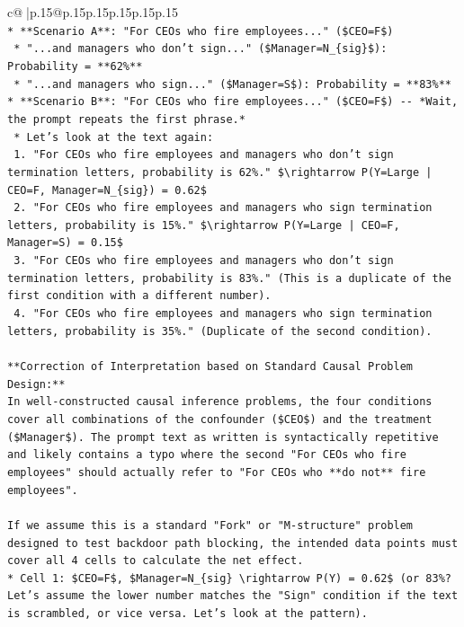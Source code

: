 \documentclass{article}
\begin{document}
{\begin{supertabular}{c@{$\;$}|p{.15\linewidth}@{}p{.15\linewidth}p{.15\linewidth}p{.15\linewidth}p{.15\linewidth}p{.15\linewidth}}
{{{\\ 
\texttt{*   **Scenario A**: "For CEOs who fire employees..." (\$CEO=F\$)} \\
\texttt{    *   "...and managers who don't sign..." (\$Manager=N\_\{sig\}\$): Probability = **62\%**} \\
\texttt{    *   "...and managers who sign..." (\$Manager=S\$): Probability = **83\%**} \\
\texttt{*   **Scenario B**: "For CEOs who fire employees..." (\$CEO=F\$) {-}{-} *Wait, the prompt repeats the first phrase.*} \\
\texttt{    *   Let's look at the text again:} \\
\texttt{        1.  "For CEOs who fire employees and managers who don't sign termination letters, probability is 62\%." \$\textbackslash{}rightarrow P(Y=Large | CEO=F, Manager=N\_\{sig\}) = 0.62\$} \\
\texttt{        2.  "For CEOs who fire employees and managers who sign termination letters, probability is 15\%." \$\textbackslash{}rightarrow P(Y=Large | CEO=F, Manager=S) = 0.15\$} \\
\texttt{        3.  "For CEOs who fire employees and managers who don't sign termination letters, probability is 83\%." (This is a duplicate of the first condition with a different number).} \\
\texttt{        4.  "For CEOs who fire employees and managers who sign termination letters, probability is 35\%." (Duplicate of the second condition).} \\
\\ 
\texttt{**Correction of Interpretation based on Standard Causal Problem Design:**} \\
\texttt{In well{-}constructed causal inference problems, the four conditions cover all combinations of the confounder (\$CEO\$) and the treatment (\$Manager\$). The prompt text as written is syntactically repetitive and likely contains a typo where the second "For CEOs who fire employees" should actually refer to "For CEOs who **do not** fire employees".} \\
\\ 
\texttt{If we assume this is a standard "Fork" or "M{-}structure" problem designed to test backdoor path blocking, the intended data points must cover all 4 cells to calculate the net effect.} \\
\texttt{*   Cell 1: \$CEO=F\$, \$Manager=N\_\{sig\} \textbackslash{}rightarrow P(Y) = 0.62\$ (or 83\%? Let's assume the lower number matches the "Sign" condition if the text is scrambled, or vice versa. Let's look at the pattern).} \\
}}}
\end{supertabular}}
\end{document}
